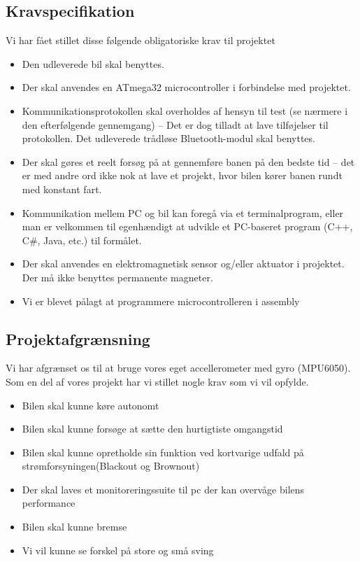 \subsection{Kravspecifikation}

Vi har fået stillet disse følgende obligatoriske krav til projektet

\begin{itemize}
	\item Den udleverede bil skal benyttes.
	\item Der skal anvendes en ATmega32 microcontroller i forbindelse med projektet.
	\item Kommunikationsprotokollen skal overholdes af hensyn til test (se nærmere i den efterfølgende gennemgang) – Det er dog tilladt at lave tilføjelser til protokollen. Det udleverede trådløse Bluetooth-modul skal benyttes.
	\item Der skal gøres et reelt forsøg på at gennemføre banen på den bedste tid – det er med andre ord ikke nok at lave et projekt, hvor bilen kører banen rundt med konstant fart.
	\item Kommunikation mellem PC og bil kan foregå via et terminalprogram, eller man er velkommen til egenhændigt at udvikle et PC-baseret program (C++, C\#, Java, etc.) til formålet.
	\item Der skal anvendes en elektromagnetisk sensor og/eller aktuator i projektet. Der må ikke benyttes permanente magneter.
	\item Vi er blevet pålagt at programmere microcontrolleren i assembly
\end{itemize}


\subsection{Projektafgrænsning}

Vi har afgrænset os til at bruge vores eget accellerometer med gyro (MPU6050).
Som en del af vores projekt har vi stillet nogle krav som vi vil opfylde.

\begin{itemize}
	\item Bilen skal kunne køre autonomt
	\item Bilen skal kunne forsøge at sætte den hurtigtiste omgangstid
	\item Bilen skal kunne opretholde sin funktion ved kortvarige udfald på strømforsyningen(Blackout og Brownout)
	\item Der skal laves et monitoreringssuite til pc der kan overvåge bilens performance
	\item Bilen skal kunne bremse
	\item Vi vil kunne se forskel på store og små sving
\end{itemize}

